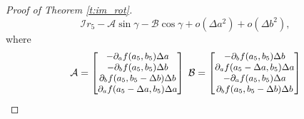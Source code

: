 \documentclass[10pt,journal,compsoc]{IEEEtran}
\begin{document}
\begin{proof}[Proof of Theorem \ref{t:im_rot}]
\begin{equation}
		\mathcal{I}  r_5 - \mathcal{A} \sin \gamma 
		- \mathcal{B} \cos \gamma 
		+ o(\Delta a^2) + o(\Delta b^2),
		\label{eq:points_r}
		\end{equation} 
		\noindent
		where
		\begin{equation}
		\small
		\mathcal{A} = 
		\begin{bmatrix}
		- \partial_a f(a_5, b_5)\Delta a \\
		- \partial_b f(a_5, b_5)\Delta b \\
		\partial_b f (a_5, b_5-\Delta b)\Delta b \\
		\partial_a f (a_5-\Delta a, b_5)\Delta a \\
		\end{bmatrix}\;
		\mathcal{B} = 
		\begin{bmatrix}
		- \partial_b f (a_5, b_5)\Delta b \\
		\partial_a f(a_5-\Delta a, b_5)\Delta a \\
		- \partial_a f (a_5, b_5)\Delta a \\
		\partial_b f (a_5, b_5-\Delta b)\Delta b \\
		\end{bmatrix}
		\label{eq:points_r_notations}
		\end{equation}

\end{proof}
\end{document}
